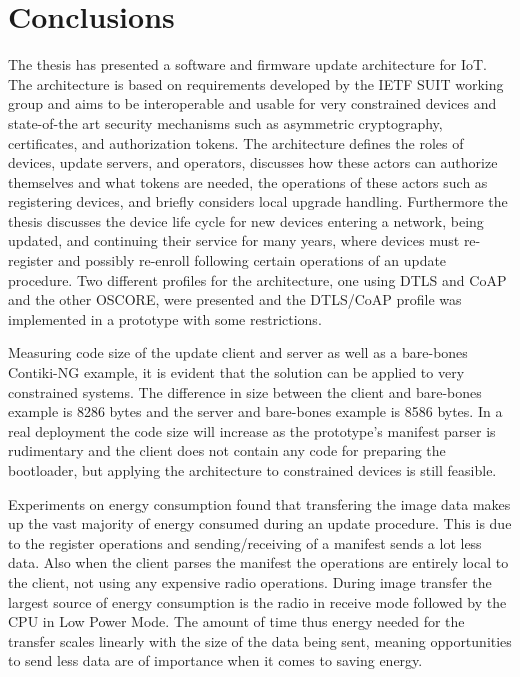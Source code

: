 \documentclass[0-thesis.tex]{subfiles}
\begin{document}

\section{Conclusions}
\label{sec:Conclusions}
The thesis has presented a software and firmware update architecture for IoT. The
architecture is based on requirements developed by the IETF SUIT working group and aims to
be interoperable and usable for very constrained devices and state-of-the art security
mechanisms such as asymmetric cryptography, certificates, and authorization tokens. The
architecture defines the roles of devices, update servers, and operators, discusses how
these actors can authorize themselves and what tokens are needed, the operations of these
actors such as registering devices, and briefly considers local upgrade handling.
Furthermore the thesis discusses the device life cycle for new devices entering a network,
being updated, and continuing their service for many years, where devices must re-register
and possibly re-enroll following certain operations of an update procedure. Two different
profiles for the architecture, one using DTLS and CoAP and the other OSCORE, were
presented and the DTLS/CoAP profile was implemented in a prototype with some restrictions.

Measuring code size of the update client and server as well as a bare-bones Contiki-NG
example, it is evident that the solution can be applied to very constrained systems. The
difference in size between the client and bare-bones example is 8286 bytes and the server
and bare-bones example is 8586 bytes. In a real deployment the code size will increase as
the prototype's manifest parser is rudimentary and the client does not contain any code
for preparing the bootloader, but applying the architecture to constrained devices is
still feasible.

Experiments on energy consumption found that transfering the image data makes up the vast
majority of energy consumed during an update procedure. This is due to the register
operations and sending/receiving of a manifest sends a lot less data. Also when the client
parses the manifest the operations are entirely local to the client, not using any
expensive radio operations. During image transfer the largest source of energy consumption
is the radio in receive mode followed by the CPU in Low Power Mode. The amount of time
thus energy needed for the transfer scales linearly with the size of the data being sent,
meaning opportunities to send less data are of importance when it comes to saving energy.
\end{document}

